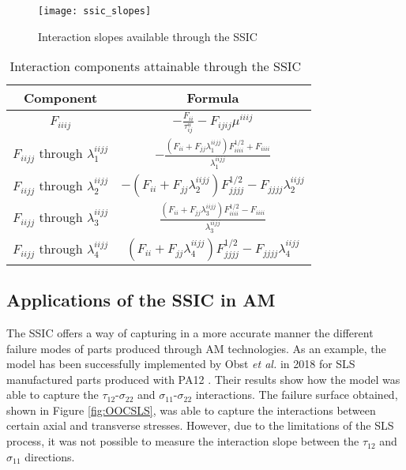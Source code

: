 \documentclass[main.tex]{subfiles}
\begin{document}
\pagebreak
\begin{figure}[h]
	\center
	\texttt{[image: ssic\_slopes]}
	\caption{Interaction slopes available through the SSIC} \label{fig:SSICdemo}
\end{figure}
\begin{table}[!htbp] %
	\renewcommand{\arraystretch}{1.5}
	\centering
	\caption{Interaction components attainable through the SSIC~\cite{Osswald2017a}}
	\begin{tabular}{ c c } 
		\toprule
		\textbf{Component} & \textbf{Formula} \\
		\midrule
		$F_{iiij}$ & $-\frac{F_{ii}}{\tau_{ij}^u}-F_{ijij}\mu^{iiij}$\\
		$F_{iijj}$ through $\lambda^{iijj}_1$ & $-\frac{(F_{ii}+F_{jj}\lambda^{iijj}_1)F_{iiii}^{1/2}+F_{iiii}}{\lambda^{iijj}_1}$\\
		$F_{iijj}$ through $\lambda^{iijj}_2$ & $-(F_{ii}+F_{jj}\lambda^{iijj}_2)F_{jjjj}^{1/2}-F_{jjjj}\lambda^{iijj}_2$\\
		$F_{iijj}$ through $\lambda^{iijj}_3$ & $\frac{(F_{ii}+F_{jj}\lambda^{iijj}_3)F_{iiii}^{1/2}-F_{iiii}}{\lambda^{iijj}_3}$\\
		$F_{iijj}$ through $\lambda^{iijj}_4$ & $(F_{ii}+F_{jj}\lambda^{iijj}_4)F_{jjjj}^{1/2}-F_{jjjj}\lambda^{iijj}_4$\\
		\bottomrule
	\end{tabular}
	\label{tab:OOCcomp}
\end{table}

\subsection{Applications of the SSIC in AM}\label{sec:SSICAM}

The SSIC offers a way of capturing in a more accurate manner the different failure modes of parts produced through AM technologies. As an example, the model has been successfully implemented by Obst \emph{et al.} in 2018 for SLS manufactured parts produced with PA12 \cite{Obst2018, Obst2017}. Their results show how the model was able to capture the $\tau_{12}$-$\sigma_{22}$ and $\sigma_{11}$-$\sigma_{22}$ interactions. The failure surface obtained, shown in Figure \ref{fig:OOCSLS}, was able to capture the interactions between certain axial and transverse stresses. However, due to the limitations of the SLS process, it was not possible to measure the interaction slope between the $\tau_{12}$ and $\sigma_{11}$ directions.
\end{document}
